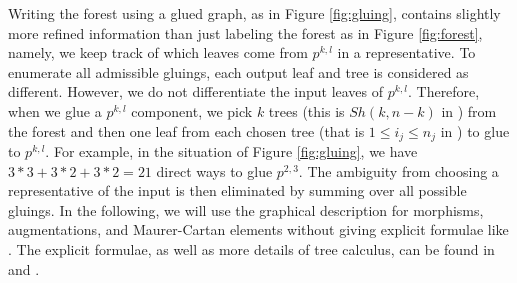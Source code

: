 \documentclass[11pt]{amsart}
\numberwithin{equation}{section}
\begin{document}
Writing the forest using a glued graph, as in Figure \ref{fig:gluing}, contains slightly more refined information than just labeling the forest as in Figure \ref{fig:forest}, namely, we keep track of which leaves come from $p^{k,l}$ in a representative. 
To enumerate all admissible gluings, each output leaf and tree is considered as different. However, we do not differentiate the input leaves of $p^{k,l}$. Therefore, when we glue a $p^{k,l}$ component, we pick $k$ trees (this is $Sh(k,n-k)$ in ) from the forest and then one leaf from each chosen tree (that is $1\le i_j\le n_j$ in ) to glue to $p^{k,l}$. For example, in the situation of Figure \ref{fig:gluing}, we have $3*3+3*2+3*2=21$ direct ways to glue $p^{2,3}$. The ambiguity from choosing a representative of the input is then eliminated by summing over all possible gluings.
In the following, we will use the graphical description for morphisms, augmentations, and Maurer-Cartan elements without giving explicit formulae like . The explicit formulae, as well as more details of tree calculus, can be found in \cite[\S 2]{moreno2024landscape} and \cite[\S 2]{moreno2024rsft}.
\end{document}
